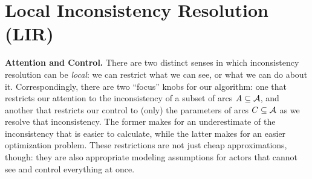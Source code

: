 

\section{Local Inconsistency Resolution (LIR)}
\textbf{Attention and Control.}
There are two distinct senses in which inconsistency resolution can
    be \emph{local}: we can restrict what we can see, or what we can do about it.
Correspondingly, there are two ``focus'' knobs for our algorithm:
    one that restricts our attention to the inconsistency of a subset of arcs $A \subseteq \mathcal A$,
    and another that restricts our control to (only) the parameters of
    arcs
    $C
     \subseteq \mathcal A$
      as we resolve that inconsistency.
The former makes for an underestimate of the inconsistency that is easier to calculate, while
the latter
makes for an easier optimization problem.
These restrictions are not just cheap approximations, though:
    they are also appropriate modeling assumptions for
    actors that cannot see and control everything at once.

